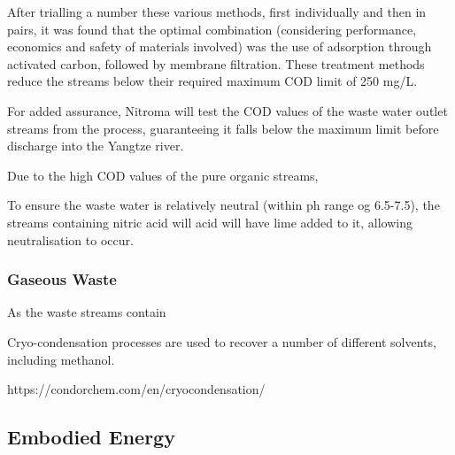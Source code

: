 After trialling a number these various methods, first individually and then in pairs, it was found that the optimal combination (considering performance, economics and safety of materials involved) was the use of adsorption through activated carbon, followed by membrane filtration. These treatment methods reduce the streams below their required maximum COD limit of 250 mg/L. 

For added assurance, Nitroma will test the COD values of the waste water outlet streams from the process, guaranteeing it falls below the maximum limit before discharge into the Yangtze river. 

Due to the high COD values of the pure organic streams, 




To ensure the waste water is relatively neutral (within ph range og 6.5-7.5), the streams containing nitric acid will acid will have lime added to it, allowing neutralisation to occur. 







\subsubsection{Gaseous Waste}

As the waste streams contain 


Cryo-condensation processes are used to recover a number of different solvents, including methanol. 

https://condorchem.com/en/cryocondensation/









\subsection{Embodied Energy}